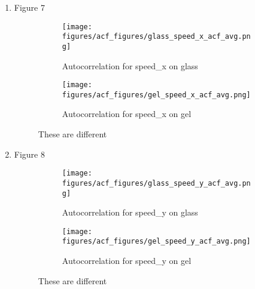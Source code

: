 \documentclass[12pt]{article}
\begin{document}
\begin{enumerate}
\item Figure 7
\begin{figure}[h!]
    \centering
    \begin{subfigure}[b]{0.4\linewidth}
      \texttt{[image: figures/acf\_figures/glass\_speed\_x\_acf\_avg.png]}
      \caption{Autocorrelation for speed_x on glass}
    \end{subfigure}
    \begin{subfigure}[b]{0.4\linewidth}
      \texttt{[image: figures/acf\_figures/gel\_speed\_x\_acf\_avg.png]}
      \caption{Autocorrelation for speed_x on gel}
    \end{subfigure}
    \caption{These are different}
    \label{fig:acf_speedx}
  \end{figure}

\item Figure 8
\begin{figure}[h!]
    \centering
    \begin{subfigure}[b]{0.4\linewidth}
      \texttt{[image: figures/acf\_figures/glass\_speed\_y\_acf\_avg.png]}
      \caption{Autocorrelation for speed_y on glass}
    \end{subfigure}
    \begin{subfigure}[b]{0.4\linewidth}
      \texttt{[image: figures/acf\_figures/gel\_speed\_y\_acf\_avg.png]}
      \caption{Autocorrelation for speed_y on gel}
    \end{subfigure}
    \caption{These are different}
    \label{fig:acf_speedy}
  \end{figure}

\end{enumerate}
\end{document}
